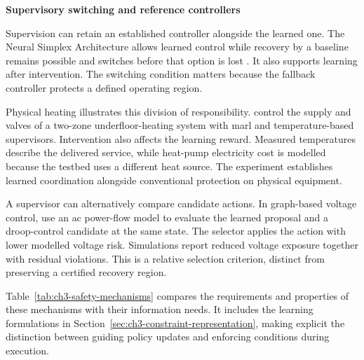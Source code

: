 \smallskip
\noindent\textbf{Supervisory switching and reference controllers}\par\nobreak\smallskip
Supervision can retain an established controller alongside the learned one. The Neural Simplex Architecture allows learned control while recovery by a baseline remains possible and switches before that option is lost \parencite{phan2020neuralsimplex}. It also supports learning after intervention. The switching condition matters because the fallback controller protects a defined operating region.

Physical heating illustrates this division of responsibility. \textcite{blad2023laboratory} control the supply and valves of a two-zone underfloor-heating system with \gls{marl} and temperature-based supervisors. Intervention also affects the learning reward. Measured temperatures describe the delivered service, while heat-pump electricity cost is modelled because the testbed uses a different heat source. The experiment establishes learned coordination alongside conventional protection on physical equipment.

A supervisor can alternatively compare candidate actions. In graph-based voltage control, \textcite{jin2026gras} use an \gls{ac} power-flow model to evaluate the learned proposal and a droop-control candidate at the same state. The selector applies the action with lower modelled voltage risk. Simulations report reduced voltage exposure together with residual violations. This is a relative selection criterion, distinct from preserving a certified recovery region.

Table~\ref{tab:ch3-safety-mechanisms} compares the requirements and properties of these mechanisms with their information needs. It includes the learning formulations in Section~\ref{sec:ch3-constraint-representation}, making explicit the distinction between guiding policy updates and enforcing conditions during execution.


